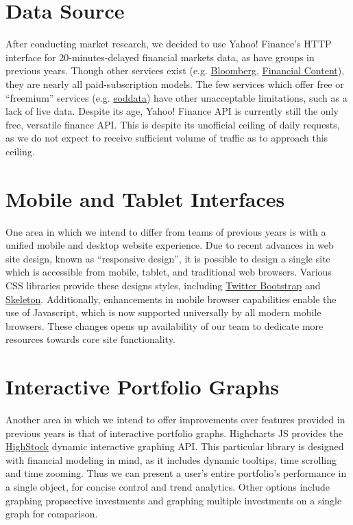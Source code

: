 \documentclass[11pt,letterpaper,oneside]{memoir}
\begin{document}
\section{Data Source}

After conducting market research, we decided to use Yahoo! Finance's HTTP 
interface for 20-minutes-delayed financial markets data, as have groups in 
previous years. Though other services
exist (e.g. 
\href{http://www.bloomberg.com/enterprise/enterprise_products/data_optimization/data_feeds/}{Bloomberg},
\href{http://www.financialcontent.com}{Financial Content}), they are nearly all paid-subscription models. 
The few services which offer free or ``freemium'' services (e.g. 
\href{http://eoddata.com}{eoddata}) have other unacceptable limitations, such as a 
lack of live data. Despite its age, Yahoo! Finance API is currently still the only 
free, versatile finance API. This is despite its unofficial ceiling of daily requests,
as we do not expect to receive sufficient volume of traffic as to approach this ceiling.

\section{Mobile and Tablet Interfaces}

One area in which we intend to differ from teams of previous years is with a unified
mobile and desktop website experience. Due to recent advances in web site design, 
known as ``responsive design'', it is possible to design a single site which is accessible 
from mobile, tablet, and traditional web browsers. Various CSS libraries provide
these designs styles, including
\href{http://twitter.github.com/bootstrap/}{Twitter Bootstrap}
and
\href{http://getskeleton.com}{Skeleton}.
Additionally, enhancements in mobile 
browser capabilities enable the use of Javascript, which is now supported universally
by all modern mobile browsers. These changes opens up availability of our team to dedicate 
more resources towards core site functionality.

\section{Interactive Portfolio Graphs}

Another area in which we intend to offer improvements over features provided in previous years
is that of interactive portfolio graphs. Highcharts JS provides the 
\href{http://www.highcharts.com/products/highstock}{HighStock} dynamic interactive graphing API.
This particular library is designed with financial modeling in mind, as it includes 
dynamic tooltips, time scrolling and time zooming. Thus we can present a user's entire 
portfolio's performance in a single object, for concise control and trend analytics. Other 
options include graphing propsective investments and graphing multiple investments on a 
single graph for comparison.
\end{document}

